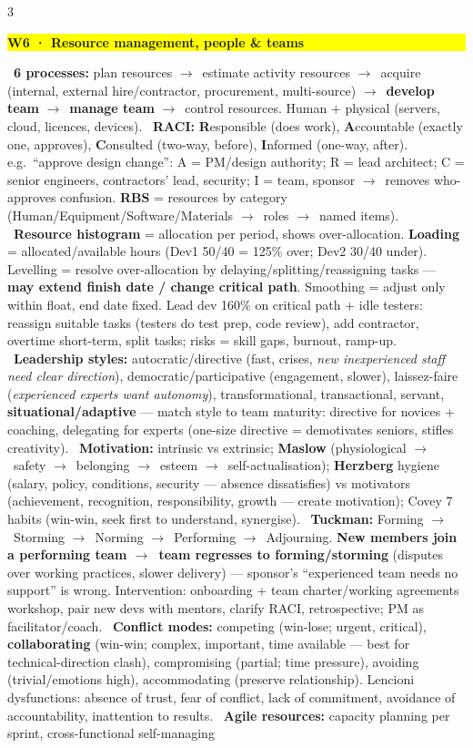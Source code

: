\documentclass[a4paper,landscape]{article}
\newcommand{\hlhighlight}[1]{\begingroup\setlength{\fboxsep}{0pt}\colorbox{yellow}{\strut\textbf{#1}}\endgroup}
\newcommand{\concept}[1]{\textbf{#1}}
\newcommand{\lbl}[1]{\textbf{#1}}
\newcommand{\kh}[1]{{\setlength{\fboxsep}{0.5pt}\colorbox{keyhlcolor}{#1}}}
\newcommand{\ra}{$\rightarrow$}
\begin{document}
\begin{multicols}{3}
\par\smallskip\noindent\hlhighlight{W6 · Resource management, people \& teams}\ \concept{6 processes:} plan resources \ra\ estimate activity resources \ra\ acquire (internal, external hire/contractor, procurement, multi-source) \ra\ \lbl{develop team} \ra\ \lbl{manage team} \ra\ control resources. Human + physical (servers, cloud, licences, devices). \textbullet\ \concept{RACI:} \lbl{R}esponsible (does work), \lbl{A}ccountable (\kh{exactly one}, approves), \lbl{C}onsulted (two-way, before), \lbl{I}nformed (one-way, after). e.g.\ ``approve design change'': A = PM/design authority; R = lead architect; C = senior engineers, contractors' lead, security; I = team, sponsor \ra\ removes who-approves confusion. \concept{RBS} = resources by category (Human/Equipment/Software/Materials \ra\ roles \ra\ named items). \textbullet\ \concept{Resource histogram} = allocation per period, shows over-allocation. \concept{Loading} = allocated/available hours (Dev1 50/40 = 125\% over; Dev2 30/40 under). \kh{Levelling} = resolve over-allocation by delaying/splitting/reassigning tasks --- \lbl{may extend finish date / change critical path}. \kh{Smoothing} = adjust only within float, end date fixed. Lead dev 160\% on critical path + idle testers: reassign suitable tasks (testers do test prep, code review), add contractor, overtime short-term, split tasks; risks = skill gaps, burnout, ramp-up. \textbullet\ \concept{Leadership styles:} autocratic/directive (fast, crises, \emph{new inexperienced staff need clear direction}), democratic/participative (engagement, slower), laissez-faire (\emph{experienced experts want autonomy}), transformational, transactional, servant, \lbl{situational/adaptive} --- \kh{match style to team maturity}: directive for novices + coaching, delegating for experts (one-size directive = demotivates seniors, stifles creativity). \textbullet\ \concept{Motivation:} intrinsic vs extrinsic; \lbl{Maslow} (physiological \ra\ safety \ra\ belonging \ra\ esteem \ra\ self-actualisation); \lbl{Herzberg} hygiene (salary, policy, conditions, security --- absence dissatisfies) vs motivators (achievement, recognition, responsibility, growth --- create motivation); Covey 7 habits (win-win, seek first to understand, synergise). \textbullet\ \concept{Tuckman:} \kh{Forming \ra\ Storming \ra\ Norming} \kh{\ra\ Performing \ra\ Adjourning}. \lbl{New members join a performing team \ra\ team regresses to forming/storming} (disputes over working practices, slower delivery) --- sponsor's ``experienced team needs no support'' is wrong. Intervention: onboarding + team charter/working agreements workshop, pair new devs with mentors, clarify RACI, retrospective; PM as facilitator/coach. \textbullet\ \concept{Conflict modes:} competing (win-lose; urgent, critical), \lbl{collaborating} (win-win; complex, important, time available --- best for technical-direction clash), compromising (partial; time pressure), avoiding (trivial/emotions high), accommodating (preserve relationship). Lencioni dysfunctions: absence of trust, fear of conflict, lack of commitment, avoidance of accountability, inattention to results. \textbullet\ \concept{Agile resources:} capacity planning per sprint, cross-functional self-managing 
\end{multicols}
\end{document}
